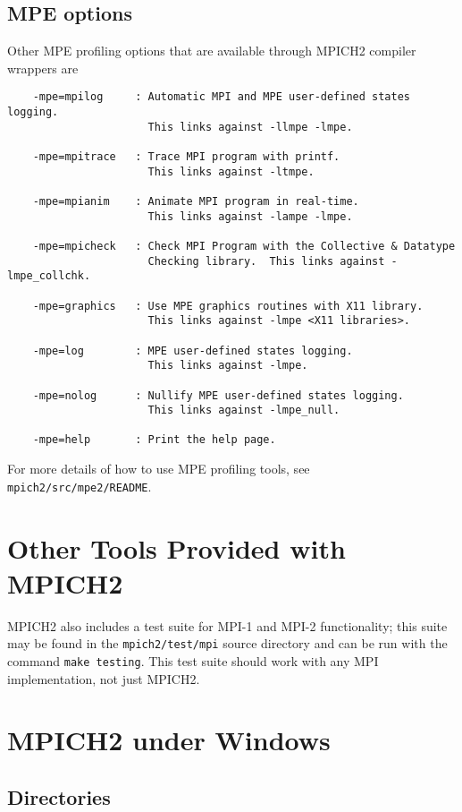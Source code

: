 \documentclass[dvipdfm,11pt]{article}
\begin{document}
\subsection{MPE options}
\label{sec:mpe_options}
Other MPE profiling options that are available through MPICH2 compiler
wrappers are 
\begin{verbatim}
    -mpe=mpilog     : Automatic MPI and MPE user-defined states logging.
                      This links against -llmpe -lmpe.

    -mpe=mpitrace   : Trace MPI program with printf.
                      This links against -ltmpe.

    -mpe=mpianim    : Animate MPI program in real-time.
                      This links against -lampe -lmpe.

    -mpe=mpicheck   : Check MPI Program with the Collective & Datatype
                      Checking library.  This links against -lmpe_collchk.

    -mpe=graphics   : Use MPE graphics routines with X11 library.
                      This links against -lmpe <X11 libraries>.

    -mpe=log        : MPE user-defined states logging.
                      This links against -lmpe.

    -mpe=nolog      : Nullify MPE user-defined states logging.
                      This links against -lmpe_null.

    -mpe=help       : Print the help page.
\end{verbatim}
For more details of how to use MPE profiling tools, see
\texttt{mpich2/src/mpe2/README}.


\section{Other Tools Provided with MPICH2}
\label{sec:other-tools}
MPICH2 also includes a test suite for MPI-1 and MPI-2 functionality; this
suite may be found in the \texttt{mpich2/test/mpi} source directory and can be
run with the command \texttt{make testing}.  This test suite should work with
any MPI implementation, not just MPICH2.

\section{MPICH2 under Windows}
\label{sec:windows}

\subsection{Directories}
\label{sec:windir}
\end{document}
